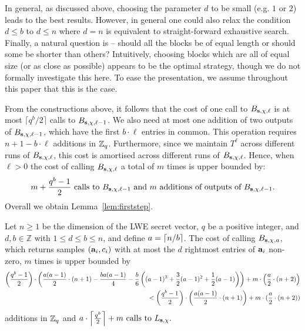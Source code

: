  In general, as discussed above, choosing the parameter $d$ to be small (e.g. $1$ or $2$) leads to the best results. However, in general one could also relax the condition $d \leq b$ to $d \leq n$ where $d=n$ is equivalent to straight-forward exhaustive search. Finally, a natural question is -- should all the blocks be of equal length or should some be shorter than others? Intuitively, choosing blocks which are all of equal size (or as close as possible) appears to be the optimal strategy, though we do not formally investigate this here. To ease the presentation, we assume throughout this paper that this is  the case.

From the constructions above, it follows that the cost of one call to ${B_{\mathbf{s},\chi,\ell}}$ is at most $\lceil q^b/2\rceil$ calls to ${B_{\mathbf{s},\chi,\ell-1}}$. We also need at most one addition of two outputs of ${B_{\mathbf{s},\chi,\ell-1}}$, which have the first $b\cdot \ell$ entries in common. This operation requires $n+1 -b\cdot \ell$ additions in $\mathbb{Z}_q$. Furthermore, since we maintain $T^{\ell}$  across different runs of ${B_{\mathbf{s},\chi,\ell}}$, this cost is amortised across different runs of ${B_{\mathbf{s},\chi,\ell}}$. Hence, when $\ell > 0$ the cost of calling ${B_{\mathbf{s},\chi,\ell}}$ a total of $m$ times  is upper bounded by:
$$m + \frac{q^b-1}{2} \mbox{ calls to } {B_{\mathbf{s},\chi,\ell-1}} \mbox{ and } m \mbox{ additions of outputs of } {B_{\mathbf{s},\chi,\ell-1}}.
$$
Overall we obtain Lemma~\ref{lem:firststep}.

\begin{lemma}
\label{lem:firststep}
Let $n\ge 1$ be the dimension of the LWE secret vector, $q$ be a positive integer, and $d,b \in \mathbb{Z}$ with $1 \le d \leq b \le n$, and define $a = \lceil n/b \rceil$. The cost of calling $B_{\mathbf{s},\chi,a}$, which returns samples $(\mathbf{a}_i,c_i)$ with at most the $d$ rightmost entries of $\mathbf{a}_i$ non-zero, $m$ times is upper bounded by 
\begin{eqnarray*}
\left(\frac{q^b-1}{2}\right)\cdot \left( \frac{a(a-1)}{2}\cdot (n+1) - \frac{ba(a-1)}{4}-\frac{b}{6}\left((a-1)^3+\frac{3}{2}(a-1)^2+\frac{1}{2}(a-1)\right) \right) + m\cdot\left(\frac{a}{2}\cdot(n+2)\right) \\< \left(\frac{q^b-1}{2}\right)\cdot \left( \frac{a(a-1)}{2}\cdot (n+1) \right) + m\cdot(\frac{a}{2}\cdot(n+2))
\end{eqnarray*}
additions in $\mathbb{Z}_q$ and $a\cdot \left\lceil \frac{q^b}{2}\right\rceil + m \mbox{ calls to } L_{\mathbf{s},\chi}.$
\end{lemma}


